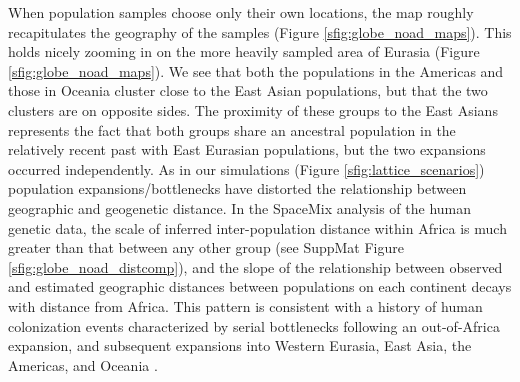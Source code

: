 \documentclass[12pt]{article}
\begin{document}
When population samples choose only their own locations, the map roughly recapitulates the geography of the samples (Figure  \ref{sfig:globe_noad_maps}). This holds nicely  zooming in on the more heavily sampled area of Eurasia (Figure  \ref{sfig:globe_noad_maps}). We see that both the populations in the Americas and those in Oceania cluster close to the East Asian populations, but that the two clusters are on opposite sides.  The proximity of these groups to the East Asians represents the fact that both groups share an ancestral population in the relatively recent past with East Eurasian populations, but the two expansions occurred independently. As in our simulations (Figure \ref{sfig:lattice_scenarios}) population expansions/bottlenecks have distorted the relationship between geographic and geogenetic distance. In the SpaceMix analysis of the human genetic data, the scale of inferred inter-population distance within Africa is much greater than that between any other group (see SuppMat Figure  \ref{sfig:globe_noad_distcomp}), and the slope of the relationship between observed and estimated geographic distances between populations on each continent decays with distance from Africa.  This pattern is consistent with a history of human colonization events characterized by serial bottlenecks \citep{Harpending_Rogers_2000,prugnolle_geography_2005,Ramachandran:05} following an out-of-Africa expansion, and subsequent expansions into Western Eurasia, East Asia, the Americas, and Oceania \citep[but see][for a discussion of other models]{pickrell_reich:14}. 
\end{document}
